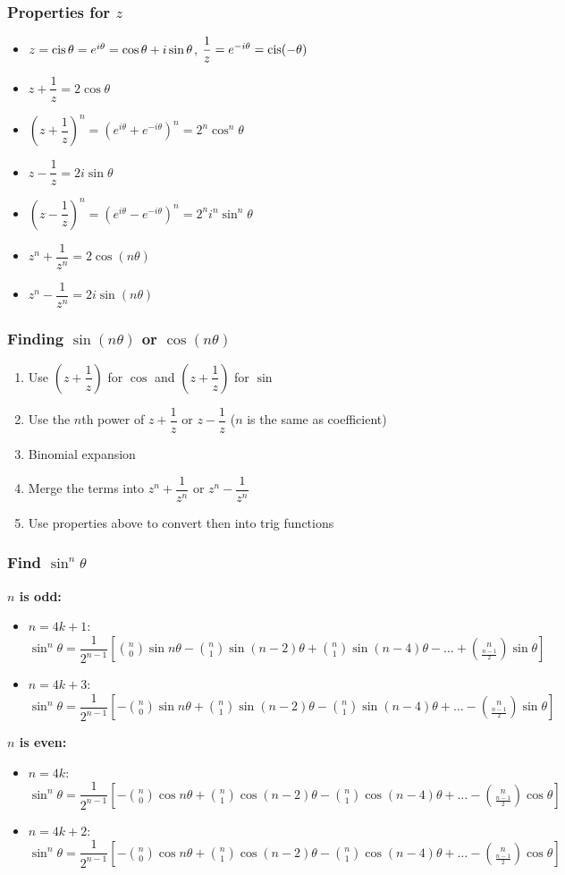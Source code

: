 \subsubsection{Properties for $z$}
\begin{itemize}
	\item $z=\operatorname{cis}\theta=e^{i\theta}=\cos\theta + i\sin\theta$, $\dfrac{1}{z} = e^{-i\theta} = \operatorname{cis} (-\theta)$
	\item $z+\dfrac{1}{z}=2\cos\theta$
	\item $(z+\dfrac{1}{z})^n=(e^{i\theta}+e^{-i\theta})^n=2^n\cos^n\theta$
	\item $z-\dfrac{1}{z}=2i\sin\theta$
	\item $(z-\dfrac{1}{z})^n=(e^{i\theta}-e^{-i\theta})^n=2^n i^n \sin^n\theta$
	\item $z^n+\dfrac{1}{z^n}=2\cos (n\theta)$
	\item $z^n-\dfrac{1}{z^n}=2i\sin (n\theta)$
\end{itemize}
\subsubsection{Finding $\sin (n\theta)$ or $\cos (n\theta)$}
\begin{enumerate}
	\item Use $(z+\dfrac{1}{z})$ for $\cos$ and $(z+\dfrac{1}{z})$ for $\sin$
	\item Use the $n$th power of $z+\dfrac{1}{z}$ or $z-\dfrac{1}{z}$ ($n$ is the same as coefficient)
	\item Binomial expansion
	\item Merge the terms into $z^n+\dfrac{1}{z^n}$ or $z^n-\dfrac{1}{z^n}$
	\item Use properties above to convert then into trig functions
\end{enumerate}
\subsubsection{Find $\sin^n\theta$}
\textbf{$n$ is odd:}
\begin{itemize}
	\item $n=4k+1$: $\sin^n\theta=\dfrac{1}{2^{n-1}}[\binom{n}{0}\sin n\theta - \binom{n}{1}\sin (n-2)\theta + \binom{n}{1}\sin (n-4)\theta - \dots + \binom{n}{\frac{n-1}{2}}\sin \theta]$
	\item $n=4k+3$: $\sin^n\theta=\dfrac{1}{2^{n-1}}[-\binom{n}{0}\sin n\theta + \binom{n}{1}\sin (n-2)\theta - \binom{n}{1}\sin (n-4)\theta + \dots - \binom{n}{\frac{n-1}{2}}\sin \theta]$
\end{itemize}
\textbf{$n$ is even:}
\begin{itemize}
	\item $n=4k$: $\sin^n\theta=\dfrac{1}{2^{n-1}}[-\binom{n}{0}\cos n\theta + \binom{n}{1}\cos (n-2)\theta - \binom{n}{1}\cos (n-4)\theta + \dots - \binom{n}{\frac{n-1}{2}}\cos \theta]$
	\item $n=4k+2$: $\sin^n\theta=\dfrac{1}{2^{n-1}}[-\binom{n}{0}\cos n\theta + \binom{n}{1}\cos (n-2)\theta - \binom{n}{1}\cos (n-4)\theta + \dots - \binom{n}{\frac{n-1}{2}}\cos \theta]$
\end{itemize}
